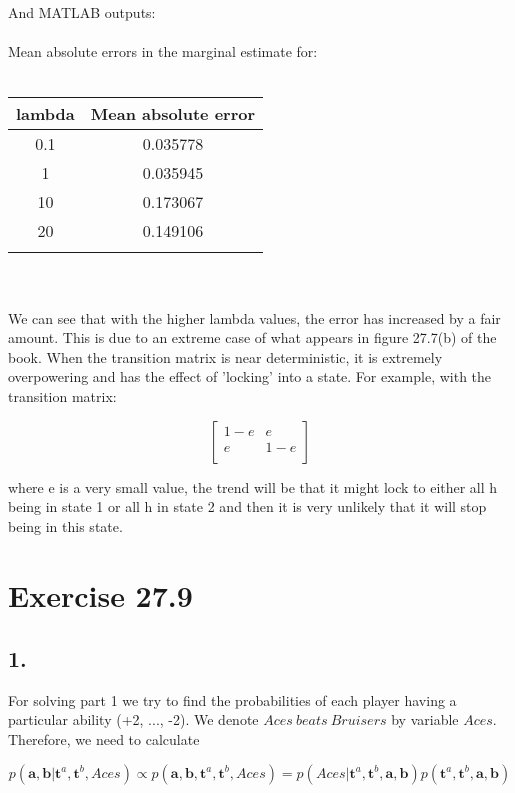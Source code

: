 \documentclass[11pt,a4paper,oneside]{report}
\begin{document}
And MATLAB outputs:\\\\
Mean absolute errors in the marginal estimate for:\\\\
\begin{tabular}{ c | c }                   
  lambda & Mean absolute error \\
  \hline  
  0.1 & 0.035778\\
  1 & 0.035945\\
  10 & 0.173067\\
  20 & 0.149106\\\\
\end{tabular}\\\\

We can see that with the higher lambda values, the error has increased by a fair amount. This is due to an extreme case of what appears in figure 27.7(b) of the book. When the transition matrix is near deterministic, it is extremely overpowering and has the effect of 'locking' into a state. For example, with the transition matrix:

$$\left[ { \begin{array}{cc} 1-e &  e \\ e & 1-e \\  \end{array} } \right]$$

where e is a very small value, the trend will be that it might lock to either all h being in state 1 or all h in state 2 and then it is very unlikely that it will stop being in this state.

\section*{Exercise 27.9}

\subsection*{1.}

For solving part 1 we try to find the probabilities of each player having a particular ability (+2, ..., -2). We denote $Aces\ beats\ Bruisers$ by variable $Aces$. Therefore, we need to calculate

\begin{equation}
 p(\textbf{a},\textbf{b}|\textbf{t}^a, \textbf{t}^b,Aces)\propto p(\textbf{a},\textbf{b}, \textbf{t}^a, \textbf{t}^b, Aces) = p(Aces| \textbf{t}^a, \textbf{t}^b, \textbf{a}, \textbf{b})p(\textbf{t}^a, \textbf{t}^b,\textbf{a},\textbf{b})
\end{equation}
\end{document}
